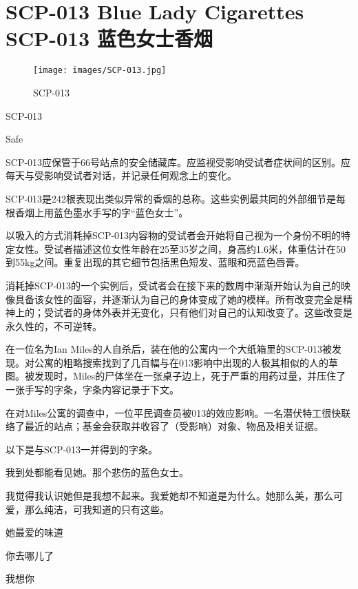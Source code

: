 \chapter[SCP-013 蓝色女士香烟]{
    SCP-013 Blue Lady Cigarettes\\
    SCP-013 蓝色女士香烟
}

\label{chap:SCP-013}

\begin{figure}[H]
    \centering
    \texttt{[image: images/SCP-013.jpg]}
    \caption*{SCP-013}
\end{figure}

SCP-013

Safe

SCP-013应保管于66号站点的安全储藏库。应监视受影响受试者症状间的区别。应每天与受影响受试者对话，并记录任何观念上的变化。

SCP-013是242根表现出类似异常的香烟的总称。这些实例最共同的外部细节是每根香烟上用蓝色墨水手写的字“蓝色女士”。

以吸入的方式消耗掉SCP-013内容物的受试者会开始将自己视为一个身份不明的特定女性。受试者描述这位女性年龄在25至35岁之间，身高约1.6米，体重估计在50到55kg之间。重复出现的其它细节包括黑色短发、蓝眼和亮蓝色唇膏。

消耗掉SCP-013的一个实例后，受试者会在接下来的数周中渐渐开始认为自己的映像具备该女性的面容，并逐渐认为自己的身体变成了她的模样。所有改变完全是精神上的；受试者的身体外表并无变化，只有他们对自己的认知改变了。这些改变是永久性的，不可逆转。

在一位名为Ian Miles的人自杀后，装在他的公寓内一个大纸箱里的SCP-013被发现。对公寓的粗略搜索找到了几百幅与在013影响中出现的人极其相似的人的草图。被发现时，Miles的尸体坐在一张桌子边上，死于严重的用药过量，并压住了一张手写的字条，字条内容记录于下文。

在对Miles公寓的调查中，一位平民调查员被013的效应影响。一名潜伏特工很快联络了最近的站点；基金会获取并收容了（受影响）对象、物品及相关证据。

以下是与SCP-013一并得到的字条。

\begin{scpbox}

我到处都能看见她。那个悲伤的蓝色女士。

我觉得我认识她但是我想不起来。我爱她却不知道是为什么。她那么美，那么可爱，那么纯洁，可我知道的只有这些。

她最爱的味道

你去哪儿了

我想你

\end{scpbox}

